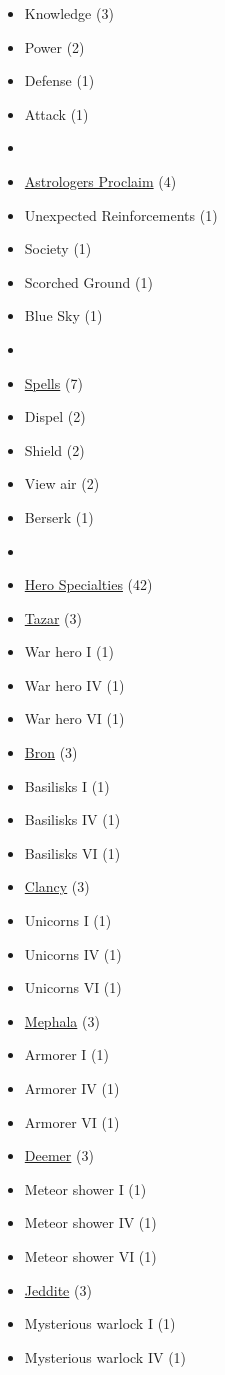 \begin{multicols}{3}
\begin{itemize}[leftmargin=0pt, label={}, noitemsep, noitemsep]
  \item Knowledge (3)
  \item Power (2)
  \item Defense (1)
  \item Attack (1)
  \item
  \item \underline{Astrologers Proclaim} (4)
  \item Unexpected Reinforcements (1)
  \item Society (1)
  \item Scorched Ground (1)
  \item Blue Sky (1)
  \item
  \item \underline{Spells} (7)
  \item Dispel (2)
  \item Shield (2)
  \item View air (2)
  \item Berserk (1)
  \item
  \item \underline{Hero Specialties} (42)
  \item \underline{Tazar} (3)
  \item War hero I (1)
  \item War hero IV (1)
  \item War hero VI (1)
  \item \underline{Bron} (3)
  \item Basilisks I (1)
  \item Basilisks IV (1)
  \item Basilisks VI (1)
  \item \underline{Clancy} (3)
  \item Unicorns I (1)
  \item Unicorns IV (1)
  \item Unicorns VI (1)
  \item \underline{Mephala} (3)
  \item Armorer I (1)
  \item Armorer IV (1)
  \item Armorer VI (1)
  \item \underline{Deemer} (3)
  \item Meteor shower I (1)
  \item Meteor shower IV (1)
  \item Meteor shower VI (1)
  \item \underline{Jeddite} (3)
  \item Mysterious warlock I (1)
  \item Mysterious warlock IV (1)

\end{itemize}
\end{multicols}
